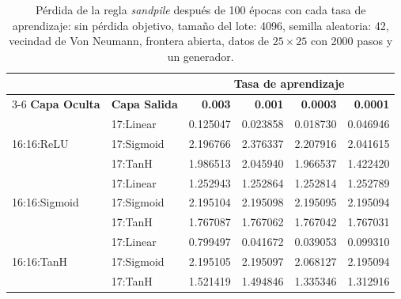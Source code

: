\begin{table}[H]
	\centering
	\footnotesize
	\begin{tabular}{llrrrr}
		\toprule
		& & \multicolumn{4}{c}{\textbf{Tasa de aprendizaje}} \\
		\cmidrule(lr){3-6}
		\textbf{Capa Oculta} & \textbf{Capa Salida} & \textbf{0.003} & \textbf{0.001} & \textbf{0.0003} & \textbf{0.0001} \\
		\midrule
		\multirow{3}{*}{16:16:ReLU} & 17:Linear & 0.125047 & 0.023858 & 0.018730 & 0.046946 \\
		& 17:Sigmoid & 2.196766 & 2.376337 & 2.207916 & 2.041615 \\
		& 17:TanH & 1.986513 & 2.045940 & 1.966537 & 1.422420 \\
		\midrule
		\multirow{3}{*}{16:16:Sigmoid} & 17:Linear & 1.252943 & 1.252864 & 1.252814 & 1.252789 \\
		& 17:Sigmoid & 2.195104 & 2.195098 & 2.195095 & 2.195094 \\
		& 17:TanH & 1.767087 & 1.767062 & 1.767042 & 1.767031 \\
		\midrule
		\multirow{3}{*}{16:16:TanH} & 17:Linear & 0.799497 & 0.041672 & 0.039053 & 0.099310 \\
		& 17:Sigmoid & 2.195105 & 2.195097 & 2.068127 & 2.195094 \\
		& 17:TanH & 1.521419 & 1.494846 & 1.335346 & 1.312916 \\
		\bottomrule
	\end{tabular}
	\caption{Pérdida de la regla \textit{sandpile} después de 100 épocas con cada tasa de aprendizaje: sin pérdida objetivo, tamaño del lote: 4096, semilla aleatoria: 42, vecindad de Von Neumann, frontera abierta, datos de $25\times25$ con 2000 pasos y un generador.}
	\label{tab:sp_ajuste_lr}
\end{table}

